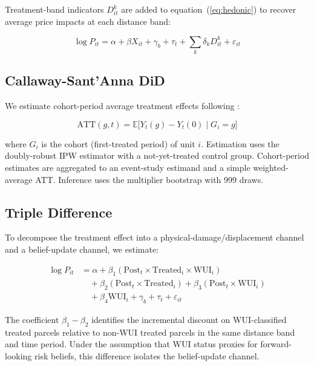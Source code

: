 \documentclass[12pt]{article}
\newcommand{\ATT}{\mathrm{ATT}}
\newcommand{\E}{\mathbb{E}}
\begin{document}
Treatment-band indicators $D^k_{it}$ are added to equation~(\ref{eq:hedonic})
to recover average price impacts at each distance band:

\begin{equation}
  \log P_{it} = \alpha + \beta X_{it} + \gamma_b + \tau_t + \sum_{k} \delta_k D^k_{it} + \varepsilon_{it}
  \label{eq:hedonic_treatment}
\end{equation}

\subsection{Callaway-Sant'Anna DiD}

We estimate cohort-period average treatment effects following \citet{CS2021}:

\begin{equation}
  \ATT(g,t) = \E\bigl[Y_t(g) - Y_t(0) \;\big|\; G_i = g\bigr]
  \label{eq:att}
\end{equation}

where $G_i$ is the cohort (first-treated period) of unit $i$. Estimation uses
the doubly-robust IPW estimator with a not-yet-treated control group. Cohort-period
estimates are aggregated to an event-study estimand and a simple weighted-average
ATT. Inference uses the multiplier bootstrap with 999 draws.

\subsection{Triple Difference}

To decompose the treatment effect into a physical-damage/displacement channel
and a belief-update channel, we estimate:

\begin{align}
  \log P_{it} &= \alpha + \beta_1 (\mathrm{Post}_t \times \mathrm{Treated}_i \times \mathrm{WUI}_i) \nonumber \\
              &\quad + \beta_2 (\mathrm{Post}_t \times \mathrm{Treated}_i)
               + \beta_3 (\mathrm{Post}_t \times \mathrm{WUI}_i) \nonumber \\
              &\quad + \beta_4 \mathrm{WUI}_i + \gamma_b + \tau_t + \varepsilon_{it}
  \label{eq:triple_diff}
\end{align}

The coefficient $\beta_1 - \beta_2$ identifies the incremental discount on
WUI-classified treated parcels relative to non-WUI treated parcels in the same
distance band and time period. Under the assumption that WUI status proxies for
forward-looking risk beliefs, this difference isolates the belief-update channel.
\end{document}
